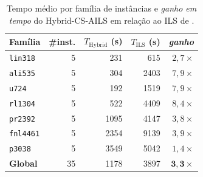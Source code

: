 \begin{table}[!htb]
\centering
\caption{Tempo médio por família de instâncias e \emph{ganho em tempo} do Hybrid-CS-AILS em relação ao ILS de \cite{freitas2025ils_pmediana}.}
\label{tab:speedup}
\small
\begin{tabular}{lrrrr}
\hline
Família & \#inst. & $T_{\mathrm{Hybrid}}$ (s) & $T_{\mathrm{ILS}}$ (s) & \emph{ganho}  \\
\hline
\texttt{lin318}  & 5 &  231 &  615 &  $2{,}7\times$ \\
\texttt{ali535}  & 5 &  304 & 2403 &  $7{,}9\times$ \\
\texttt{u724}    & 5 &  192 & 1519 &  $7{,}9\times$ \\
\texttt{rl1304}  & 5 &  522 & 4409 &  $8{,}4\times$ \\
\texttt{pr2392}  & 5 & 1095 & 4147 &  $3{,}8\times$ \\
\texttt{fnl4461} & 5 & 2354 & 9139 &  $3{,}9\times$ \\
\texttt{p3038}   & 5 & 3549 & 5042 &  $1{,}4\times$ \\
\hline
\textbf{Global}  & 35 & 1178 & 3897 & $\mathbf{3{,}3\times}$ \\
\hline
\end{tabular}
\end{table}
